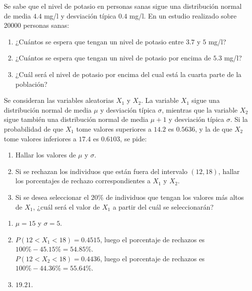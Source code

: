 {Se sabe que el nivel de potasio en personas sanas sigue una distribución normal de media $4.4$ mg/l y desviación típica $0.4$ mg/l. En un estudio realizado sobre 20000 personas sanas:

\begin{enumerate}
\item  ¿Cuántos se espera que tengan un nivel de potasio entre $3.7$ y $5$ mg/l?
\item  ¿Cuántos se espera que tengan un nivel de potasio por encima de $5.3$ mg/l?
\item  ¿Cuál será el nivel de potasio por encima del cual está la cuarta parte de la población?
\end{enumerate}
}
{}
{}


{Se consideran las variables aleatorias $X_1$ y $X_2$. La variable $X_1$ sigue una distribución normal de media $\mu$ y
desviación típica $\sigma$, mientras que la variable $X_2$ sigue también una distribución normal de media $\mu + 1$ y
desviación típica $\sigma$. Si la probabilidad de que $X_1$ tome valores superiores a $14.2$ es $0.5636$, y la de que
$X_2$ tome valores inferiores a $17.4$ es $0.6103$, se pide:
\begin{enumerate}
\item Hallar los valores de $\mu$ y $\sigma$.
\item Si se rechazan los individuos que están fuera del intervalo $(12,18)$, hallar los porcentajes de rechazo
correspondientes a $X_1$ y $X_2$.
\item Si se desea seleccionar el $20\%$ de individuos que tengan los valores más altos de $X_1$, ¿cuál será el valor
de $X_1$ a partir del cuál se seleccionarán?
\end{enumerate}
}
{
\begin{enumerate}
\item $\mu=15$ y $\sigma=5$.
\item $P(12<X_1<18)=0.4515$, luego el porcentaje de rechazos es $100\%-45.15\%=54.85\%$.\\
$P(12<X_2<18)=0.4436$, luego el porcentaje de rechazos es $100\%-44.36\% = 55.64\%$.
\item $19.21$.
\end{enumerate}
}
{}



